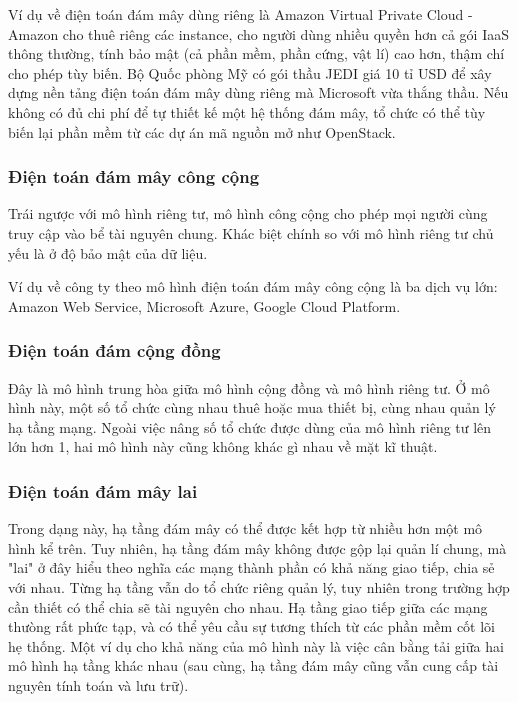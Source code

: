 \documentclass{article}
\begin{document}
Ví dụ về điện toán đám mây dùng riêng là Amazon Virtual Private Cloud - Amazon
cho thuê riêng các instance, cho người dùng nhiều quyền hơn cả gói IaaS thông
thường, tính bảo mật (cả phần mềm, phần cứng, vật lí) cao hơn, thậm chí cho phép
tùy biến. Bộ Quốc phòng Mỹ có gói thầu JEDI giá 10 tỉ USD để xây dựng nền tảng
điện toán đám mây dùng riêng mà Microsoft vừa thắng thầu. Nếu không có đủ chi
phí để tự thiết kế một hệ thống đám mây, tổ chức có thể tùy biến lại phần mềm từ
các dự án mã nguồn mở như OpenStack.

\subsubsection{Điện toán đám mây công cộng}

Trái ngược với mô hình riêng tư, mô hình công cộng cho phép mọi người cùng truy
cập vào bể tài nguyên chung. Khác biệt chính so với mô hình riêng tư chủ yếu là
ở độ bảo mật của dữ liệu.

Ví dụ về công ty theo mô hình điện toán đám mây công cộng là ba dịch vụ lớn:
Amazon Web Service, Microsoft Azure, Google Cloud Platform.

\subsubsection{Điện toán đám cộng đồng}

Đây là mô hình trung hòa giữa mô hình cộng đồng và mô hình riêng tư. Ở mô hình
này, một số tổ chức cùng nhau thuê hoặc mua thiết bị, cùng nhau quản lý hạ tầng
mạng. Ngoài việc nâng số tổ chức được dùng của mô hình riêng tư lên lớn hơn 1,
hai mô hình này cũng không khác gì nhau về mặt kĩ thuật.

\subsubsection{Điện toán đám mây lai}

Trong dạng này, hạ tầng đám mây có thể được kết hợp từ nhiều hơn một mô hình kể
trên. Tuy nhiên, hạ tầng đám mây không được gộp lại quản lí chung, mà "lai" ở
đây hiểu theo nghĩa các mạng thành phần có khả năng giao tiếp, chia sẻ với nhau.
Từng hạ tầng vẫn do tổ chức riêng quản lý, tuy nhiên trong trường hợp cần thiết
có thể chia sẽ tài nguyên cho nhau. Hạ tầng giao tiếp giữa các mạng thưòng rất
phức tạp, và có thể yêu cầu sự tương thích từ các phần mềm cốt lõi hẹ thống. Một
ví dụ cho khả năng của mô hình này là việc cân bằng tải giữa hai mô hình hạ tầng
khác nhau (sau cùng, hạ tầng đám mây cũng vẫn cung cấp tài nguyên tính toán và
lưu trữ).
\end{document}
